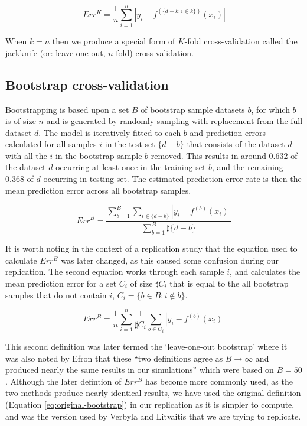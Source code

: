 \begin{equation}
Err^{K}  = \frac{1}{n} \sum_{i=1}^{n} | y_i - f^{(\{d-k : i \in k\})}(x_i) |
\end{equation}

When $k = n$ then we produce a special form of $K$-fold cross-validation
called the jackknife (or: leave-one-out, $n$-fold) cross-validation.

\subsection{Bootstrap cross-validation}

Bootstrapping\supercite{diaconis-1983} is based upon a set $B$ of bootstrap sample datasets $b$,
for which $b$ is of size $n$ and is generated by randomly sampling with
replacement from the full dataset $d$. The model is
iteratively fitted to each $b$ and prediction errors calculated for all
samples $i$ in the test set $\{d - b\}$ that consists of the dataset $d$ with
all the $i$ in the bootstrap sample $b$ removed. This results in around
0.632 of the dataset $d$ occurring at least once in the training set $b$,
and the remaining 0.368 of $d$ occurring in testing set\supercite{hastie-2009}. The estimated prediction error rate is then the mean
prediction error across all bootstrap samples\supercite{efron-1983, jain-1987}.

\begin{equation}
Err^{B} = \dfrac{\sum\limits_{b=1}^{B}\sum\limits_{{i \in \{ d-b \} }}| y_i - f^{(b)}(x_i) |}{\sum\limits_{b=1}^{B} \sharp \{ d-b \}}
\label{eq:original-bootstrap}
\end{equation}

It is worth noting in the context of a replication study that the
equation used to calculate $Err^{B}$ was later changed, as this caused
some confusion during our replication. The second equation\supercite{efron-1993} works through
each sample $i$, and calculates the mean prediction error for a set
$C_i$ of size $\sharp C_i$ that is equal to the all bootstrap samples
that do not contain $i$, $C_i = \{ b \in B : i \notin b \}$.

\begin{equation}
Err^{B} = \frac{1}{n} \sum_{i=1}^{n} \frac{1}{\sharp C_i} \sum_{b \in C_i} | y_i - f^{(b)}(x_i) |
\end{equation}

This second definition was later termed the `leave-one-out bootstrap'
where it was also noted by Efron\supercite{efron-1997} that these ``two definitions agree as
$B \rightarrow \infty$ and produced nearly the same results in our
simulations'' which were based on $B=50$. Although the later
defintion of $Err^{B}$ has become more commonly used\supercite{hastie-2009}, 
as the two methods produce nearly identical results, we
have used the original definition (Equation \ref{eq:original-bootstrap})
in our replication as it is simpler to compute, and was the version used
by Verbyla and Litvaitis\supercite{verbyla-1989} that we are trying to replicate.

